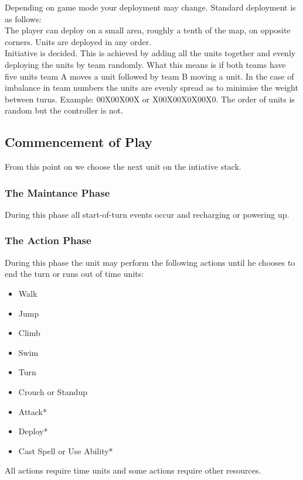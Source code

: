 \documentclass[a4paper,twocolumn]{article}
\begin{document}
Depending on game mode your deployment may change. Standard deployment is as follows:\\
 The player can deploy on a small area, roughly a tenth of the map, on opposite corners. Units are deployed in any order. \\
 Initiative is decided. This is achieved by adding all the units together and evenly deploying the units by team randomly. What this means is if both teams have five units team A moves a unit followed by team B moving a unit. In the case of imbalance in team numbers the units are evenly spread as to minimise the weight between turns. Example: 00X00X00X or X00X00X0X00X0. The order of units is random but the controller is not.

\subsection{Commencement of Play}

From this point on we choose the next unit on the intiative stack.

\subsubsection{The Maintance Phase}

During this phase all start-of-turn events occur and recharging or powering up.

\subsubsection{The Action Phase}

During this phase the unit may perform the following actions until he chooses to end the turn or runs out of time units:
\begin{itemize}
\item Walk
\item Jump
\item Climb
\item Swim
\item Turn
\item Crouch or Standup
\item Attack*
\item Deploy*
\item Cast Spell or Use Ability*
\end{itemize}

All actions require time units and some actions require other resources.
\end{document}

